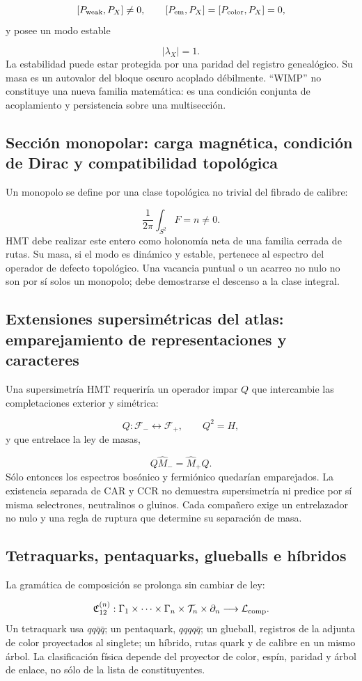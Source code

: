 \[
 [P_{\rm weak},P_X]\ne0,\qquad
 [P_{\rm em},P_X]=[P_{\rm color},P_X]=0,
\]
y posee un modo estable

\[
 |\lambda_X|=1.
\]
La estabilidad puede estar protegida por una paridad del registro genealógico. Su masa es un autovalor del bloque oscuro acoplado débilmente. “WIMP” no constituye una nueva familia matemática: es una condición conjunta de acoplamiento y persistencia sobre una multisección.

\subsection{Sección monopolar: carga magnética, condición de Dirac y compatibilidad topológica}
Un monopolo se define por una clase topológica no trivial del fibrado de calibre:

\[
 \frac1{2\pi}\int_{S^2}F=n\ne0.
\]
HMT debe realizar este entero como holonomía neta de una familia cerrada de rutas. Su masa, si el modo es dinámico y estable, pertenece al espectro del operador de defecto topológico. Una vacancia puntual o un acarreo no nulo no son por sí solos un monopolo; debe demostrarse el descenso a la clase integral.

\subsection{Extensiones supersimétricas del atlas: emparejamiento de representaciones y caracteres}
Una supersimetría HMT requeriría un operador impar \(Q\) que intercambie las completaciones exterior y simétrica:

\[
 Q:\mathcal F_-\leftrightarrow\mathcal F_+,
\qquad
 Q^2=H,
\]
y que entrelace la ley de masas,

\[
 Q\widehat M_-=\widehat M_+Q.
\]
Sólo entonces los espectros bosónico y fermiónico quedarían emparejados. La existencia separada de CAR y CCR no demuestra supersimetría ni predice por sí misma selectrones, neutralinos o gluinos. Cada compañero exige un entrelazador no nulo y una regla de ruptura que determine su separación de masa.

\subsection{Tetraquarks, pentaquarks, glueballs e híbridos}
La gramática de composición se prolonga sin cambiar de ley:

\[
 \mathfrak C_{12}^{(n)}:
 \Gamma_1\times\cdots\times\Gamma_n
 \times\mathcal T_n\times\partial_n
 \longrightarrow\mathcal L_{\rm comp}.
\]
Un tetraquark usa \(qq\bar q\bar q\); un pentaquark, \(qqqq\bar q\); un glueball, registros de la adjunta de color proyectados al singlete; un híbrido, rutas quark y de calibre en un mismo árbol. La clasificación física depende del proyector de color, espín, paridad y árbol de enlace, no sólo de la lista de constituyentes.

